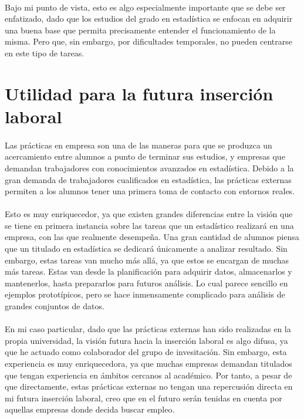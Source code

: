 \documentclass[11pt,a4paper,spanish]{article}
\begin{document}
    \paragraph{}
    Bajo mi punto de vista, esto es algo especialmente importante que se debe ser enfatizado, dado que los estudios del grado en estadística se enfocan en adquirir una buena base que permita precisamente entender el funcionamiento de la misma. Pero que, sin embargo, por dificultades temporales, no pueden centrarse en este tipo de tareas.


  \section{Utilidad para la futura inserción laboral}

    \paragraph{}
    Las prácticas en empresa son una de las maneras para que se produzca un acercamiento entre alumnos a punto de terminar sus estudios, y empresas que demandan trabajadores con conocimientos avanzados en estadística. Debido a la gran demanda de trabajadores cualificados en estadística, las prácticas externas permiten a los alumnos tener una primera toma de contacto con entornos reales.

    \paragraph{}
    Esto es muy enriquecedor, ya que existen grandes diferencias entre la visión que se tiene en primera instancia sobre las tareas que un estadístico realizará en una empresa, con las que realmente desempeña. Una gran cantidad de alumnos piensa que un titulado en estadística se dedicará únicamente a analizar resultado. Sin embargo, estas tareas van mucho más allá, ya que estos se encargan de muchas más tareas. Estas van desde la planificación para adquirir datos, almacenarlos y mantenerlos, hasta prepararlos para futuros análisis. Lo cual parece sencillo en ejemplos prototípicos, pero se hace inmensamente complicado para análisis de grandes conjuntos de datos.

    \paragraph{}
    En mi caso particular, dado que las prácticas externas han sido realizadas en la propia universidad, la visión futura hacia la inserción laboral es algo difusa, ya que he actuado como colaborador del grupo de invesitación. Sin embargo, esta experiencia es muy enriquecedora, ya que muchas empresas demandan titulados que tengan experiencia en ámbitos cercanos al académico. Por tanto, a pesar de que directamente, estas prácticas externas no tengan una repercusión directa en mi futura inserción laboral, creo que en el futuro serán tenidas en cuenta por aquellas empresas donde decida buscar empleo.
\end{document}
